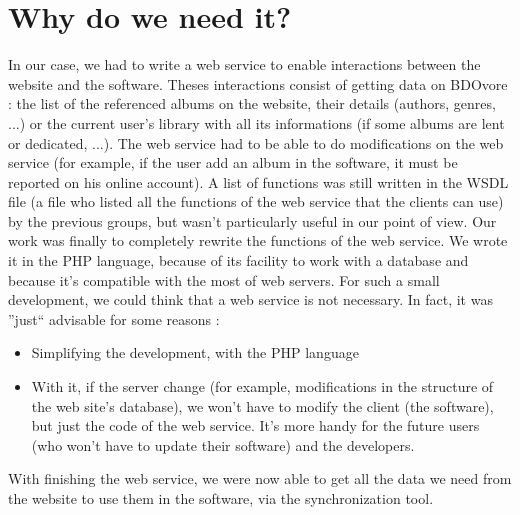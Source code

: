 \documentclass[11pt]{report} %
\begin{document}
\section{Why do we need it?}
%
%
In our case, we had to write a web service to enable interactions between the website and the software. Theses interactions consist of getting data on BDOvore : the list of the referenced albums on the website, their details (authors, genres, ...) or the current user's library with all its informations (if some albums are lent or dedicated, ...). The web service had to be able to do modifications on the web service (for example, if the user add an album in the software, it must be reported on his online account).
\newline A list of functions was still written in the WSDL file (a file who listed all the functions of the web service that the clients can use) by the previous groups, but wasn't particularly useful in our point of view.
\newline Our work was finally to completely rewrite the functions of the web service. We wrote it in the PHP language, because of its facility to work with a database and because it's compatible with the most of web servers.
\newline For such a small development, we could think that a web service is not necessary. In fact, it was ''just`` advisable for some reasons :

\begin{itemize}
\item Simplifying the development, with the PHP language 
\item With it, if the server change (for example, modifications in the structure of the web site's database), we won't have to modify the client (the software), but just the code of the web service. It's more handy for the future users (who won't have to update their software) and the developers. 
\end{itemize}

With finishing the web service, we were now able to get all the data we need from the website to use them in the software, via the synchronization tool.
\end{document}
